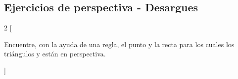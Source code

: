 \newpage
\subsection{Ejercicios de perspectiva - Desargues}

\begin{multicols}{2}
    [
        \begin{section-exercise}
            Encuentre, con la ayuda de una regla, el punto y la recta para los cuales los triángulos  y  están en perspectiva.
        \end{section-exercise}
    ]

    \begin{figure}[H]
        \centering
        
    \end{figure}

    \begin{figure}[H]
        \centering
        
    \end{figure}

    \begin{figure}[H]
        \centering
        
    \end{figure}

    \begin{figure}[H]
        \centering
        
    \end{figure}

\end{multicols}